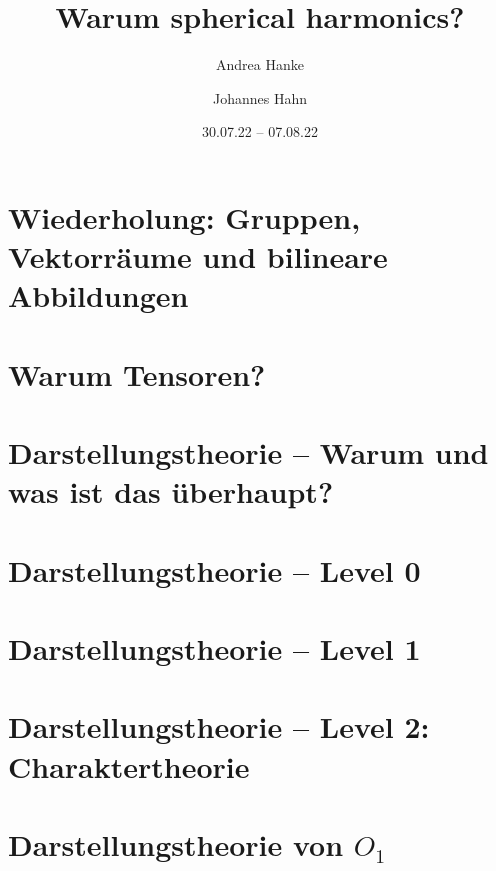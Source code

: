 \documentclass[fontsize=11pt,fleqn,a4paper]{scrartcl}
\author{Andrea Hanke \and Johannes Hahn}
\title{Warum spherical harmonics?}
\date{30.07.22 -- 07.08.22}
\begin{document}
\maketitle

\tableofcontents
\pagebreak
\setcounter{section}{-1}
\section{Wiederholung: Gruppen, Vektorräume und bilineare Abbildungen}



\pagebreak

\section{Warum Tensoren?}



\pagebreak
\section{Darstellungstheorie -- Warum und was ist das überhaupt?}




\pagebreak
\section{Darstellungstheorie -- Level 0}




\pagebreak
\section{Darstellungstheorie -- Level 1}




\pagebreak
\section{Darstellungstheorie -- Level 2: Charaktertheorie}



\pagebreak
\section{Darstellungstheorie \texorpdfstring{von $O_1$}{der Isometriegruppe der reellen Geraden}}

\end{document}
